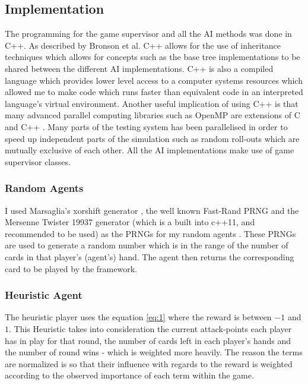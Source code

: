 \documentclass[journal]{IEEEtran}
\begin{document}
  \subsection{Implementation}
  The programming for the game supervisor and all the AI methods was done in C++. As described by Bronson et al. \cite{bronson2012c++} C++ allows for the use of inheritance techniques which allows for concepts such as the base tree implementations to be shared between the different AI implementations. C++ is also a compiled language which provides lower level access to a computer systems resources which allowed me to make code which runs faster than equivalent code in an interpreted language's virtual environment. Another useful implication of using C++ is that many advanced parallel computing libraries such as OpenMP are extensions of C and C++ \cite{parallel}. Many parts of the testing system has been parallelised in order to speed up independent parts of the simulation such as random roll-outs which are mutually exclusive of each other. All the AI implementations make use of game supervisor classes.\\

  \subsubsection{Random Agents}
  I used Marsaglia's xorshift generator \cite{marsaglia} \cite{XOR}, the well known Fast-Rand PRNG \cite{frand} and the Mersenne Twister 19937 generator (which is a built into c++11, and recommended to be used) as the PRNGs for my random agents \cite{mt}. These PRNGs are used to generate a random number which is in the range of the number of cards in that player's (agent's) hand. The agent then returns the corresponding card to be played by the framework.\\

  \subsubsection{Heuristic Agent}
  The heuristic player uses the equation \ref{eq:1} where the reward is between $-1$ and $1$. This Heuristic takes into consideration the current attack-points each player has in play for that round, the number of cards left in each player's hands and the number of round wins - which is weighted more heavily. The reason the terms are normalized is so that their influence with regards to the reward is weighted according to the observed importance of each term within the game.
\end{document}
